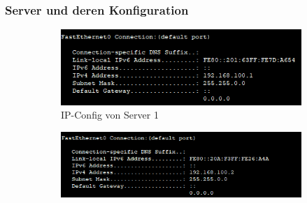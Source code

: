 \subsubsection{Server und deren Konfiguration}
\begin{figure}[!htb]
    \centering
    \begin{subfigure}{.7\textwidth}
        \includegraphics[width=\textwidth,height=\textwidth,keepaspectratio]{./img/aufbau/Server1.png}
        \caption{IP-Config von Server 1}
    \end{subfigure}
    \begin{subfigure}{.7\textwidth}
        \includegraphics[width=\textwidth,height=.5\textwidth,keepaspectratio]{./img/aufbau/Server2.png}

\end{subfigure}
\end{figure}
